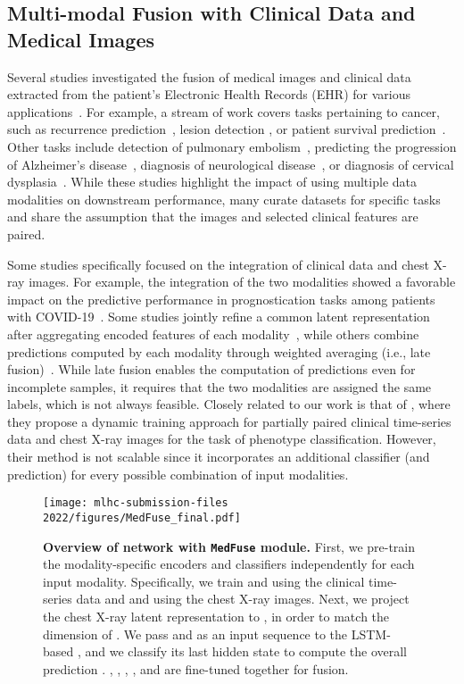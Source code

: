 \documentclass[pmlr]{jmlr}
\begin{document}
\subsection{Multi-modal Fusion with Clinical Data and Medical Images} 
Several studies investigated the fusion of medical images and clinical data extracted from the patient's Electronic Health Records (EHR) for various applications~\citep{Huang2020_survey}. For example, a stream of work covers tasks pertaining to cancer, such as recurrence prediction~\citep{cancer_recurrence}, lesion detection \citep{cancers_diag}, or patient survival prediction~\citep{cancer_survival}. Other tasks include detection of pulmonary embolism~\citep{Huang2020}, predicting the progression of Alzheimer’s disease~\citep{MildInt}, diagnosis of neurological disease~\citep{9534148}, or diagnosis of cervical dysplasia~\citep{cervical}. While these studies highlight the impact of using multiple data modalities on downstream performance, many curate datasets for specific tasks and share the assumption that the images and selected clinical features are paired.

Some studies specifically focused on the integration of clinical data and chest X-ray images. For example, the integration of the two modalities showed a favorable impact on the predictive performance in prognostication tasks among patients with COVID-19~\citep{Shamout2021, Jiao2021}. Some studies jointly refine a common latent representation after aggregating encoded features of each modality~\citep{Cardiomegaly_ehr_cxr, Jiao2021}, while others combine predictions computed by each modality through weighted averaging (i.e., late fusion)~\citep{Shamout2021, Jiao2021}. While late fusion enables the computation of predictions even for incomplete samples, it requires that the two modalities are assigned the same labels, which is not always feasible. Closely related to our work is that of \cite{hayat2021dynamic}, where they propose a dynamic training approach for partially paired clinical time-series data and chest X-ray images for the task of phenotype classification. However, their method is not scalable since it incorporates an additional classifier (and prediction) for every possible combination of input modalities.



\begin{figure*}[t!]
    \centering
    \texttt{[image: mlhc-submission-files 2022/figures/MedFuse\_final.pdf]}
    \vspace{-5mm}
    \caption{\small\textbf{Overview of network with \texttt{MedFuse} module.} First, we pre-train the modality-specific encoders and classifiers independently for each input modality. Specifically, we train  and  using the clinical time-series data and  and  using the chest X-ray images. Next, we project the chest X-ray latent representation  to , in order to match the dimension of . We pass  and  as an input sequence to the LSTM-based , and we classify its last hidden state  to compute the overall prediction . , , , , and  are fine-tuned together for fusion.\vspace{-5mm} }
    \label{fig:main_fig}
    \vspace{-4mm}
\end{figure*}
\end{document}
